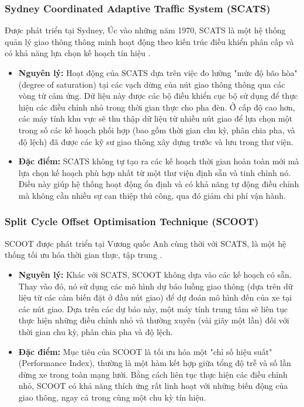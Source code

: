\subsubsection{Sydney Coordinated Adaptive Traffic System (SCATS)}
Được phát triển tại Sydney, Úc vào những năm 1970, SCATS là một hệ thống quản lý
giao thông thông minh hoạt động theo kiến trúc điều khiển phân cấp và có khả năng
lựa chọn kế hoạch tín hiệu \cite{Sims1980}.
\begin{itemize}
    \item \textbf{Nguyên lý:} Hoạt động của SCATS dựa trên việc đo lường "mức độ
        bão hòa" (degree of saturation) tại các vạch dừng của nút giao thông
        thông qua các vòng từ cảm ứng. Dữ liệu này được các bộ điều khiển cục bộ
        sử dụng để thực hiện các điều chỉnh nhỏ trong thời gian thực cho pha đèn.
        Ở cấp độ cao hơn, các máy tính khu vực sẽ thu thập dữ liệu từ nhiều nút giao
        để lựa chọn một trong số các kế hoạch phối hợp (bao gồm thời gian chu kỳ,
        phân chia pha, và độ lệch) đã được các kỹ sư giao thông xây dựng trước và
        lưu trong thư viện.

    \item \textbf{Đặc điểm:} SCATS không tự tạo ra các kế hoạch thời gian hoàn
        toàn mới mà lựa chọn kế hoạch phù hợp nhất từ một thư viện định sẵn và
        tinh chỉnh nó. Điều này giúp hệ thống hoạt động ổn định và có khả năng tự
        động điều chỉnh mà không cần nhiều sự can thiệp thủ công, qua đó giảm
        chi phí vận hành.
\end{itemize}

\subsubsection{Split Cycle Offset Optimisation Technique (SCOOT)}
SCOOT được phát triển tại Vương quốc Anh cùng thời với SCATS, là một hệ thống
tối ưu hóa thời gian thực, tập trung \cite{Hunt1981}.
\begin{itemize}
    \item \textbf{Nguyên lý:} Khác với SCATS, SCOOT không dựa vào các kế hoạch có
        sẵn. Thay vào đó, nó sử dụng các mô hình dự báo luồng giao thông (dựa
        trên dữ liệu từ các cảm biến đặt ở đầu nút giao) để dự đoán mô hình đến của
        xe tại các nút giao. Dựa trên các dự báo này, một máy tính trung tâm sẽ liên
        tục thực hiện những điều chỉnh nhỏ và thường xuyên (vài giây một lần) đối
        với thời gian chu kỳ, phân chia pha và độ lệch.

    \item \textbf{Đặc điểm:} Mục tiêu của SCOOT là tối ưu hóa một "chỉ số hiệu suất"
        (Performance Index), thường là một hàm kết hợp giữa tổng độ trễ và số lần
        dừng xe trong toàn mạng lưới. Bằng cách liên tục thực hiện các điều
        chỉnh nhỏ, SCOOT có khả năng thích ứng rất linh hoạt với những biến động
        của giao thông, ngay cả trong cùng một chu kỳ tín hiệu.
\end{itemize}

